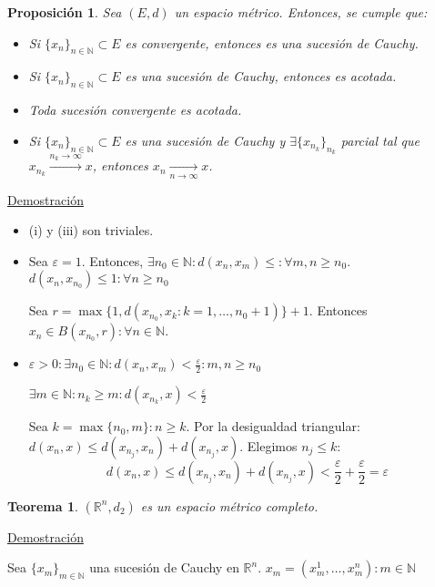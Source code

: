 \documentclass[10pt,a4paper,openright]{book}
\theoremstyle{break}
\newtheorem*{theo}{Teorema}
\newtheorem*{prop}{Proposición}
\begin{document}
\begin{prop}
Sea $(E,d)$ un espacio métrico. Entonces, se cumple que:
\begin{itemize}
\item Si $\{x_n\}_{n\in \mathbb{N}} \subset E$ es convergente, entonces es una sucesión de Cauchy.
\item Si $\{x_n\}_{n\in \mathbb{N}} \subset E$ es una sucesión de Cauchy, entonces es acotada.
\item Toda sucesión convergente es acotada.
\item Si $\{x_n\}_{n\in \mathbb{N}} \subset E$ es una sucesión de Cauchy y $\exists \{ x_{n_k}\}_{n_k} $ parcial tal que $x_{n_k} \xrightarrow{n_k\rightarrow\infty} x$, entonces $x_n \xrightarrow[n\rightarrow\infty]{} x$.
\end{itemize}
\end{prop}

\underline{Demostración}

\begin{itemize}
\item (i) y (iii) son triviales.
\item Sea $\varepsilon = 1$. Entonces, $\exists n_0 \in \mathbb{N} : d(x_n, x_m) \leq : \forall m,n \geq n_0$. 
$d(x_n, x_{n_0}) \leq 1 : \forall n \geq n_0$

Sea $r = \max \{1, d(x_{n_0}, x_k : k=1, \ldots, n_0 + 1)\} + 1$. Entonces $x_n \in B(x_{n_0}, r) : \forall n \in \mathbb{N}$.

\item $\varepsilon > 0 : \exists n_0 \in \mathbb{N} : d(x_n,x_m) < \frac{\varepsilon}{2} : m, n \geq n_0$

$\exists m \in \mathbb{N} : n_k \geq m: d(x_{n_k}, x) < \frac{\varepsilon}{2}$

Sea $k = \max\{n_0, m\} : n \geq k$. Por la desigualdad triangular:
$d(x_n, x) \leq d(x_{n_j}, x_n) + d(x_{n_j},x)$. Elegimos $n_j \leq k$:
$$d(x_n, x) \leq d(x_{n_j}, x_n) + d(x_{n_j},x) < \frac{\varepsilon}{2} + \frac{\varepsilon}{2} = \varepsilon$$
\end{itemize}

\begin{theo}
$(\mathbb{R}^n, d_2)$ es un espacio métrico completo.
\end{theo}

\underline{Demostración}

Sea $\{x_m\}_{m\in \mathbb{N}}$ una sucesión de Cauchy en $\mathbb{R}^n$. $x_m = (x_m^1, \ldots , x_m^n) : m \in \mathbb{N}$
\end{document}
